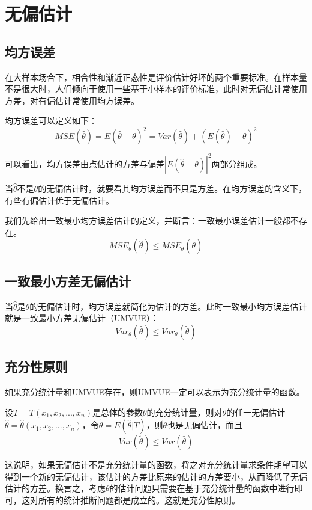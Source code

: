 \documentclass[
]{book}
\begin{document}
\section{无偏估计}\label{ux65e0ux504fux4f30ux8ba1}

\subsection{均方误差}\label{ux5747ux65b9ux8befux5dee}

在大样本场合下，相合性和渐近正态性是评价估计好坏的两个重要标准。在样本量不是很大时，人们倾向于使用一些基于小样本的评价标准，此时对无偏估计常使用方差，对有偏估计常使用均方误差。

均方误差可以定义如下：
\[
MSE(\hat{\theta})=E(\hat{\theta}-\theta)^2=Var(\hat{\theta})+(E(\hat{\theta})-\theta)^2
\]

可以看出，均方误差由点估计的方差与偏差\(|E(\hat{\theta}-\theta)|^2\)两部分组成。

当\(\hat{\theta}\)不是\(\theta\)的无偏估计时，就要看其均方误差而不只是方差。在均方误差的含义下，有些有偏估计优于无偏估计。

我们先给出一致最小均方误差估计的定义，并断言：一致最小误差估计一般都不存在。
\[
MSE_{\theta}(\hat{\theta})\leq MSE_{\theta}(\tilde{\theta})
\]

\subsection{一致最小方差无偏估计}\label{ux4e00ux81f4ux6700ux5c0fux65b9ux5deeux65e0ux504fux4f30ux8ba1}

当\(\hat{\theta}\)是\(\theta\)的无偏估计时，均方误差就简化为估计的方差。此时一致最小均方误差估计就是一致最小方差无偏估计（UMVUE）：
\[
Var_{\theta}(\hat{\theta})\leq Var_{\theta}(\tilde{\theta})
\]

\subsection{充分性原则}\label{ux5145ux5206ux6027ux539fux5219}

如果充分统计量和UMVUE存在，则UMVUE一定可以表示为充分统计量的函数。

设\(T=T(x_1,x_2,...,x_n)\)是总体的参数\(\theta\)的充分统计量，则对\(\theta\)的任一无偏估计\(\hat{\theta}=\hat{\theta}(x_1,x_2,...,x_n)\)，令\(\tilde{\theta}=E(\hat{\theta}|T)\)，则\(\tilde{\theta}\)也是无偏估计，而且
\[
Var(\tilde{\theta})\leq Var(\hat{\theta})
\]

这说明，如果无偏估计不是充分统计量的函数，将之对充分统计量求条件期望可以得到一个新的无偏估计，该估计的方差比原来的估计的方差要小，从而降低了无偏估计的方差。换言之，考虑\(\theta\)的估计问题只需要在基于充分统计量的函数中进行即可，这对所有的统计推断问题都是成立的。这就是充分性原则。
\end{document}
